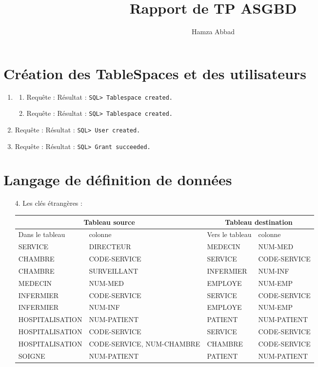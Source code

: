 \documentclass[12pt,a4paper]{article}
\author{Hamza Abbad}
\title{Rapport de TP ASGBD}
\begin{document}
\section{Création des TableSpaces et des utilisateurs}
	\begin{enumerate}
		\item
		\begin{enumerate}
			\item Requête : 
				Résultat : \texttt{SQL> Tablespace created.}
			\item Requête : 
			Résultat : \texttt{SQL> Tablespace created.}
		\end{enumerate}
		\item Requête : 
			Résultat : \texttt{SQL> User created.}
		\item Requête : 
			Résultat : \texttt{SQL> Grant succeeded.}
	\end{enumerate}
\section{Langage de définition de données}
	\begin{enumerate}
		\item[4.] Les clés étrangères :\\
		\renewcommand{\arraystretch}{1.2}
		\begin{tabular}{|*{4}{p{4cm}|}}
		\hline
		\multicolumn{2}{|c|}{Tableau source} & \multicolumn{2}{|c|}{Tableau destination} \\ \hline
		Dans le tableau & colonne & Vers le tableau & colonne \\ \hline
		SERVICE & DIRECTEUR & MEDECIN & NUM-MED \\ \hline
		CHAMBRE & CODE-SERVICE & SERVICE & CODE-SERVICE \\ \hline
		CHAMBRE & SURVEILLANT & INFERMIER & NUM-INF \\ \hline
		MEDECIN & NUM-MED & EMPLOYE & NUM-EMP \\ \hline
		INFERMIER & CODE-SERVICE & SERVICE & CODE-SERVICE \\ \hline
		INFERMIER & NUM-INF & EMPLOYE & NUM-EMP \\ \hline
		HOSPITALISATION & NUM-PATIENT & PATIENT & NUM-PATIENT \\ \hline
		HOSPITALISATION & CODE-SERVICE & SERVICE & CODE-SERVICE \\ \hline
		HOSPITALISATION & CODE-SERVICE, NUM-CHAMBRE & CHAMBRE & CODE-SERVICE \\ \hline
		SOIGNE & NUM-PATIENT & PATIENT & NUM-PATIENT \\ \hline
		\end{tabular}
	\end{enumerate}
\end{document}
